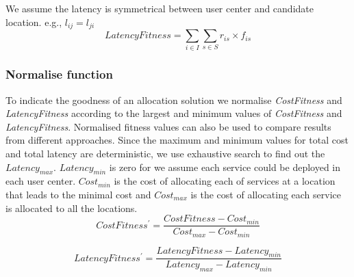 \documentclass{llncs}
\begin{document}

We assume the latency is symmetrical between user center and candidate location.
e.g., $l_{ij} = l_{ji}$
	\begin{equation}
		LatencyFitness = \sum\limits_{i \in I} \sum\limits_{s \in S} r_{is} \times f_{is}
	\end{equation}

\subsubsection{Normalise function}
To indicate the goodness of an allocation solution we normalise \emph{CostFitness} and \emph{LatencyFitness} according to the largest and minimum values of
\emph{CostFitness} and \emph{LatencyFitness}. Normalised fitness values can also be used to compare results from different approaches.
Since the maximum and minimum values for total cost and total latency are deterministic, we use exhaustive search to
find out the $Latency_{max}$. $Latency_{min}$ is zero for we assume each service could be deployed in each user center. 
$Cost_{min}$ is the cost of allocating each of services at a location that leads to the minimal cost and $Cost_{max}$ is the cost of allocating each service is allocated to all the 
locations.
	\begin{equation}
		\label{eq:cost_prime}
		CostFitness^\prime = \frac{CostFitness - Cost_{min}}{Cost_{max} - Cost_{min}}
	\end{equation}

	\begin{equation}
		\label{eq:latency_prime}
		LatencyFitness^\prime = \frac{LatencyFitness - Latency_{min}}{Latency_{max} - Latency_{min}}
	\end{equation}

\end{document}
